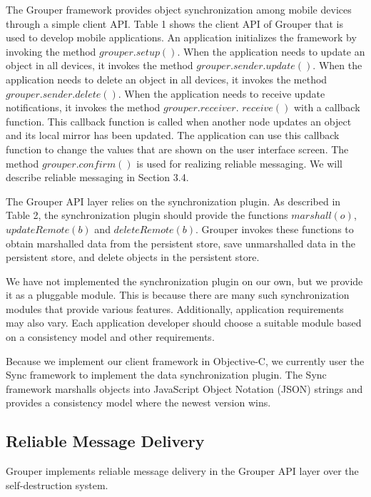 \documentclass[sigconf]{acmart}
\begin{document}
The Grouper framework provides object synchronization among mobile devices through a simple client API.
Table 1 shows the client API of Grouper that is used to develop mobile applications.
An application initializes the framework by invoking the method $grouper.setup()$.
When the application needs to update an object in all devices, it invokes the method $grouper.sender.update()$.
When the application needs to delete an object in all devices, it invokes the method $grouper.sender.delete()$.
When the application needs to receive update notifications, it invokes the method $grouper.receiver.$ $receive()$ with a callback function.
This callback function is called when another node updates an object and its local mirror has been updated.
The application can use this callback function to change the values that are shown on the user interface screen.
The method $grouper.confirm()$ is used for realizing reliable messaging.
We will describe reliable messaging in Section 3.4.

The Grouper API layer relies on the synchronization plugin.
As described in Table 2, the synchronization plugin should provide the functions $marshall(o)$, $updateRemote(b)$ and $deleteRemote(b)$.
Grouper invokes these functions to obtain marshalled data from the persistent store, save unmarshalled data in the persistent store, and delete objects in the persistent store.

We have not implemented the synchronization plugin on our own, but we provide it as a pluggable module.
This is because there are many such synchronization modules that provide various features.
Additionally, application requirements may also vary.
Each application developer should choose a suitable module based on a consistency model and other requirements.

Because we implement our client framework in Objective-C, we currently user the Sync framework\cite{sync} to implement the data synchronization plugin.
The Sync framework marshalls objects into JavaScript Object Notation (JSON) strings and provides a consistency model where the newest version wins.

\subsection{Reliable Message Delivery}

Grouper implements reliable message delivery in the Grouper API layer over the self-destruction system.
\end{document}
